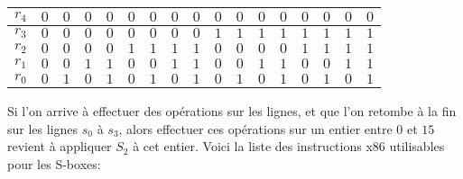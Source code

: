 \documentclass{article}
\begin{document}
\medbreak
\begin{center}
\begin{tabular}{|l|l|l|l|l|l|l|l|l|l|l|l|l|l|l|l|l|}
\hline
\multicolumn{1}{|l|}{$r_{4}$}&	\multicolumn{1}{|l|}{$0$}&	\multicolumn{1}{|l|}{$0$}&	\multicolumn{1}{|l|}{$0$}&	\multicolumn{1}{|l|}{$0$}&	\multicolumn{1}{|l|}{$0$}&	\multicolumn{1}{|l|}{$0$}&	\multicolumn{1}{|l|}{$0$}&	\multicolumn{1}{|l|}{$0$}&	\multicolumn{1}{|l|}{$0$}&	\multicolumn{1}{|l|}{$0$}&	\multicolumn{1}{|l|}{$0$}&	\multicolumn{1}{|l|}{$0$}&	\multicolumn{1}{|l|}{$0$}&	\multicolumn{1}{|l|}{$0$}&	\multicolumn{1}{|l|}{$0$}&	\multicolumn{1}{|l|}{$0$}	\\
\hline
\multicolumn{1}{|l|}{$r_{3}$}&	\multicolumn{1}{|l|}{$0$}&	\multicolumn{1}{|l|}{ $0$}&	\multicolumn{1}{|l|}{ $0$}&	\multicolumn{1}{|l|}{ $0$}&	\multicolumn{1}{|l|}{ $0$}&	\multicolumn{1}{|l|}{ $0$}&	\multicolumn{1}{|l|}{ $0$}&	\multicolumn{1}{|l|}{ $0$}&	\multicolumn{1}{|l|}{ $1$}&	\multicolumn{1}{|l|}{ $1$}&	\multicolumn{1}{|l|}{ $1$}&	\multicolumn{1}{|l|}{ $1$}&	\multicolumn{1}{|l|}{ $1$}&	\multicolumn{1}{|l|}{ $1$}&	\multicolumn{1}{|l|}{ $1$}&	\multicolumn{1}{|l|}{ $1$}	\\
\hline
\multicolumn{1}{|l|}{ $r_{2}$}&	\multicolumn{1}{|l|}{ $0$}&	\multicolumn{1}{|l|}{ $0$}&	\multicolumn{1}{|l|}{ $0$}&	\multicolumn{1}{|l|}{ $0$}&	\multicolumn{1}{|l|}{ $1$}&	\multicolumn{1}{|l|}{ $1$}&	\multicolumn{1}{|l|}{ $1$}&	\multicolumn{1}{|l|}{ $1$}&	\multicolumn{1}{|l|}{ $0$}&	\multicolumn{1}{|l|}{ $0$}&	\multicolumn{1}{|l|}{ $0$}&	\multicolumn{1}{|l|}{ $0$}&	\multicolumn{1}{|l|}{ $1$}&	\multicolumn{1}{|l|}{ $1$}&	\multicolumn{1}{|l|}{ $1$}&	\multicolumn{1}{|l|}{ $1$}	\\
\hline
\multicolumn{1}{|l|}{ $r_{1}$}&	\multicolumn{1}{|l|}{ $0$}&	\multicolumn{1}{|l|}{ $0$}&	\multicolumn{1}{|l|}{ $1$}&	\multicolumn{1}{|l|}{ $1$}&	\multicolumn{1}{|l|}{ $0$}&	\multicolumn{1}{|l|}{ $0$}&	\multicolumn{1}{|l|}{ $1$}&	\multicolumn{1}{|l|}{ $1$}&	\multicolumn{1}{|l|}{ $0$}&	\multicolumn{1}{|l|}{ $0$}&	\multicolumn{1}{|l|}{ $1$}&	\multicolumn{1}{|l|}{ $1$}&	\multicolumn{1}{|l|}{ $0$}&	\multicolumn{1}{|l|}{ $0$}&	\multicolumn{1}{|l|}{ $1$}&	\multicolumn{1}{|l|}{ $1$}	\\
\hline
\multicolumn{1}{|l|}{ $r_{0}$}&	\multicolumn{1}{|l|}{ $0$}&	\multicolumn{1}{|l|}{ $1$}&	\multicolumn{1}{|l|}{ $0$}&	\multicolumn{1}{|l|}{ $1$}&	\multicolumn{1}{|l|}{ $0$}&	\multicolumn{1}{|l|}{ $1$}&	\multicolumn{1}{|l|}{ $0$}&	\multicolumn{1}{|l|}{ $1$}&	\multicolumn{1}{|l|}{ $0$}&	\multicolumn{1}{|l|}{ $1$}&	\multicolumn{1}{|l|}{ $0$}&	\multicolumn{1}{|l|}{ $1$}&	\multicolumn{1}{|l|}{ $0$}&	\multicolumn{1}{|l|}{ $1$}&	\multicolumn{1}{|l|}{ $0$}&	\multicolumn{1}{|l|}{ $1$}	\\
\hline
\end{tabular}
\end{center}
\medbreak
 Si l'on arrive à effectuer des opérations sur les lignes, et que l'on retombe à la fin sur  les lignes $s_{0}$ à $s_{3}$, alors effectuer ces opérations sur un entier entre $0$ et $15$ revient à appliquer $S_{2}$ à cet entier. 
Voici la liste des instructions x86 utilisables pour les S-boxes:
\end{document}
